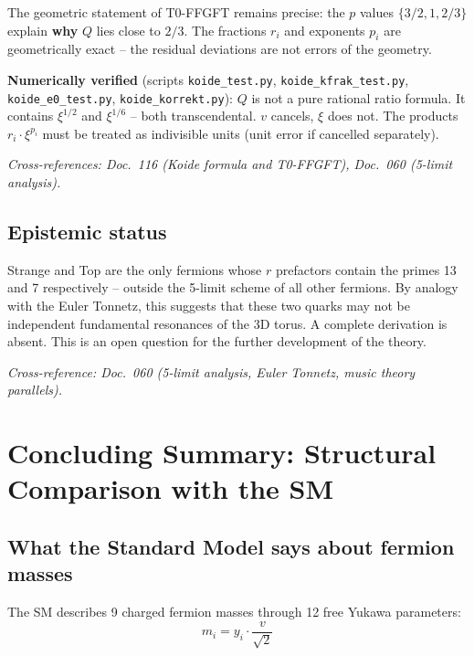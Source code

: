 The geometric statement of T0-FFGFT remains precise:
the $p$ values $\{3/2, 1, 2/3\}$ explain \textbf{why} $Q$ lies
close to $2/3$. The fractions $r_i$ and exponents $p_i$ are
geometrically exact -- the residual deviations are not errors
of the geometry.

\textbf{Numerically verified} (scripts \texttt{koide\_test.py},
\texttt{koide\_kfrak\_test.py}, \texttt{koide\_e0\_test.py},
\texttt{koide\_korrekt.py}):
$Q$ is not a pure rational ratio formula. It contains
$\xi^{1/2}$ and $\xi^{1/6}$ -- both transcendental. $v$ cancels,
$\xi$ does not. The products $r_i \cdot \xi^{p_i}$ must be treated
as indivisible units (unit error if cancelled separately).

\noindent\textit{Cross-references: Doc.~116 (Koide formula and T0-FFGFT),
Doc.~060 (5-limit analysis).}

\subsection{Epistemic status}

\begin{predbox}
Strange and Top are the only fermions whose $r$ prefactors contain
the primes 13 and 7 respectively -- outside the 5-limit scheme of
all other fermions. By analogy with the Euler Tonnetz, this suggests
that these two quarks may not be independent fundamental resonances
of the 3D torus. A complete derivation is absent. This is an open
question for the further development of the theory.
\end{predbox}

\noindent\textit{Cross-reference: Doc.~060 (5-limit analysis, Euler Tonnetz,
music theory parallels).}

\section{Concluding Summary: Structural Comparison with the SM}

\subsection{What the Standard Model says about fermion masses}

The SM describes 9 charged fermion masses through 12 free Yukawa
parameters:
\begin{equation}
    m_i = y_i \cdot \frac{v}{\sqrt{2}}
\end{equation}

